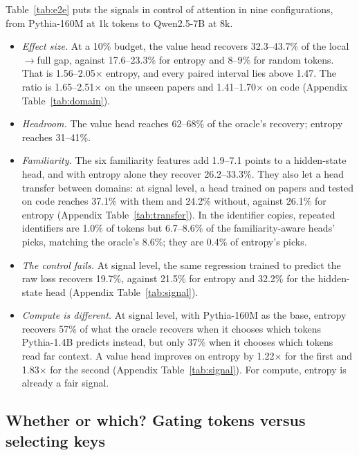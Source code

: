 \documentclass[11pt]{article}
\begin{document}
Table~\ref{tab:e2e} puts the signals in control of attention in nine configurations, from Pythia-160M at 1k tokens to Qwen2.5-7B at 8k.
\begin{itemize}
\item \emph{Effect size.} At a 10\% budget, the value head recovers 32.3--43.7\% of the local$\to$full gap, against 17.6--23.3\% for entropy and 8--9\% for random tokens. That is 1.56--2.05$\times$ entropy, and every paired interval lies above 1.47. The ratio is 1.65--2.51$\times$ on the unseen papers and 1.41--1.70$\times$ on code (Appendix Table~\ref{tab:domain}).
\item \emph{Headroom.} The value head reaches 62--68\% of the oracle's recovery; entropy reaches 31--41\%.
\item \emph{Familiarity.} The six familiarity features add 1.9--7.1 points to a hidden-state head, and with entropy alone they recover 26.2--33.3\%. They also let a head transfer between domains: at signal level, a head trained on papers and tested on code reaches 37.1\% with them and 24.2\% without, against 26.1\% for entropy (Appendix Table~\ref{tab:transfer}). In the identifier copies, repeated identifiers are 1.0\% of tokens but 6.7--8.6\% of the familiarity-aware heads' picks, matching the oracle's 8.6\%; they are 0.4\% of entropy's picks.
\item \emph{The control fails.} At signal level, the same regression trained to predict the raw loss recovers 19.7\%, against 21.5\% for entropy and 32.2\% for the hidden-state head (Appendix Table~\ref{tab:signal}).
\item \emph{Compute is different.} At signal level, with Pythia-160M as the base, entropy recovers 57\% of what the oracle recovers when it chooses which tokens Pythia-1.4B predicts instead, but only 37\% when it chooses which tokens read far context. A value head improves on entropy by 1.22$\times$ for the first and 1.83$\times$ for the second (Appendix Table~\ref{tab:signal}). For compute, entropy is already a fair signal.
\end{itemize}

\subsection{Whether or which? Gating tokens versus selecting keys}\label{sec:which}

\begin{table}[t]
\centering
\small
\caption{Whether versus which, and where: \% of the local$\to$full gap recovered (natural text, first split), with the share of queries that touch far memory and the share of far keys read. Quest-style scoring also reads block summaries worth 1/16 of the far keys for every query it serves.}
\label{tab:which}
\end{table}
\end{document}
